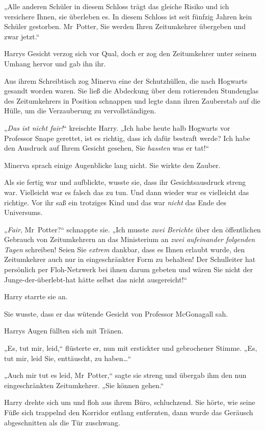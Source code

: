 {„Alle anderen Schüler in diesem Schloss trägt das gleiche Risiko und ich versichere Ihnen, sie überleben es. In diesem Schloss ist seit fünfzig Jahren kein Schüler gestorben. Mr~Potter, Sie werden Ihren Zeitumkehrer übergeben und zwar jetzt.“

Harrys Gesicht verzog sich vor Qual, doch er zog den Zeitumkehrer unter seinem Umhang hervor und gab ihn ihr.

Aus ihrem Schreibtisch zog Minerva eine der Schutzhüllen, die nach Hogwarts gesandt worden waren. Sie ließ die Abdeckung über dem rotierenden Stundenglas des Zeitumkehrers in Position schnappen und legte dann ihren Zauberstab auf die Hülle, um die Verzauberung zu vervollständigen.

„\emph{Das ist nicht fair!}“ kreischte Harry. „Ich habe heute halb Hogwarts vor Professor Snape gerettet, ist es richtig, dass ich dafür bestraft werde? Ich habe den Ausdruck auf Ihrem Gesicht gesehen, Sie \emph{hassten} was er tat!“

Minerva sprach einige Augenblicke lang nicht. Sie wirkte den Zauber.

Als sie fertig war und aufblickte, wusste sie, dass ihr Gesichtsausdruck streng war. Vielleicht war es falsch das zu tun. Und dann wieder war es vielleicht das richtige. Vor ihr saß ein trotziges Kind und das war \emph{nicht} das Ende des Universums.

„\emph{Fair}, Mr~Potter?“ schnappte sie. „Ich musste \emph{zwei Berichte} über den öffentlichen Gebrauch von Zeitumkehrern an das Ministerium an \emph{zwei aufeinander folgenden Tagen} schreiben! Seien Sie \emph{extrem} dankbar, dass es Ihnen erlaubt wurde, den Zeitumkehrer auch nur in eingeschränkter Form zu behalten! Der Schulleiter hat persönlich per Floh-Netzwerk bei ihnen darum gebeten und wären Sie nicht der Junge-der-überlebt-hat hätte selbst das nicht ausgereicht!“

Harry starrte sie an.

Sie wusste, dass er das wütende Gesicht von Professor McGonagall sah.

Harrys Augen füllten sich mit Tränen.

„Es, tut mir, leid,“ flüsterte er, nun mit erstickter und gebrochener Stimme. „Es, tut mir, leid Sie, enttäuscht, zu haben…“

„Auch mir tut es leid, Mr~Potter,“ sagte sie streng und übergab ihm den nun eingeschränkten Zeitumkehrer. „Sie können gehen.“

Harry drehte sich um und floh aus ihrem Büro, schluchzend. Sie hörte, wie seine Füße sich trappelnd den Korridor entlang entfernten, dann wurde das Geräusch abgeschnitten als die Tür zuschwang.

}
